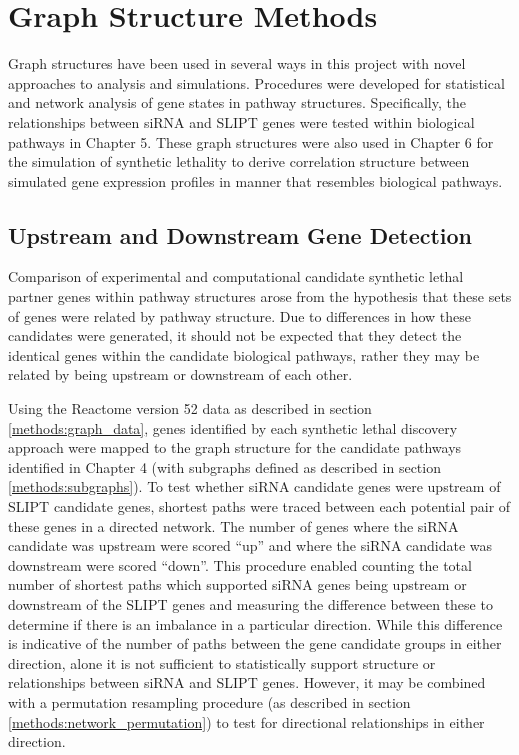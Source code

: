 \FloatBarrier

\section{Graph Structure Methods}
Graph structures have been used in several ways in this project with novel approaches to analysis and simulations. Procedures were developed for statistical and network analysis of gene states in pathway structures. Specifically, the relationships between siRNA and SLIPT genes were tested within biological pathways in Chapter 5. These graph structures were also used in Chapter 6 for the simulation of synthetic lethality to derive correlation structure between simulated gene expression profiles in manner that resembles biological pathways.


\subsection{Upstream and Downstream Gene Detection} \label{methods:pathway_str} 
Comparison of experimental and computational candidate synthetic lethal partner genes within pathway structures arose from the hypothesis that these sets of genes were related by pathway structure. Due to differences in how these candidates were generated, it should not be expected that they detect the identical genes within the candidate biological pathways, rather they may be related by being upstream or downstream of each other. 

Using the Reactome version 52 data \citep{Reactome} as described in section \ref{methods:graph_data}, genes identified by each synthetic lethal discovery approach were mapped to the graph structure for the candidate pathways identified in Chapter 4 (with subgraphs defined as described in section \ref{methods:subgraphs}). To test whether siRNA candidate genes were upstream of SLIPT candidate genes, shortest paths were traced between each potential pair of these genes in a directed network. The number of genes where the siRNA candidate was upstream were scored ``up'' and where the siRNA candidate was downstream were scored ``down''.  This procedure enabled counting the total number of shortest paths which supported siRNA genes being upstream or downstream of the SLIPT genes and measuring the difference between these to determine if there is an imbalance in a particular direction. While this difference is indicative of the number of paths between the gene candidate groups in either direction, alone it is not sufficient to statistically support structure or relationships between siRNA and SLIPT genes. However, it may be combined with a permutation resampling procedure (as described in section \ref{methods:network_permutation}) to test for directional relationships in either direction.

